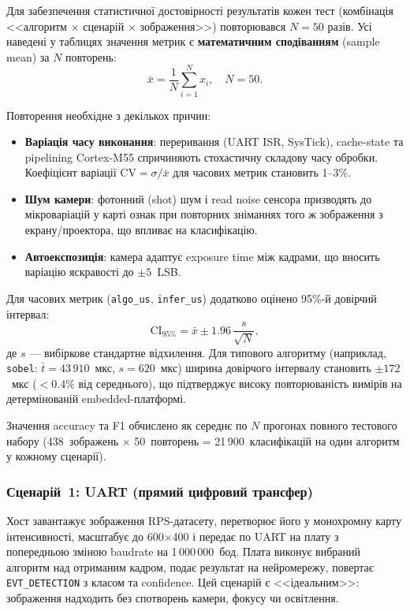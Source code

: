 \documentclass[a4paper,12pt]{article}
\begin{document}
Для забезпечення статистичної достовірності результатів кожен тест (комбінація <<алгоритм $\times$ сценарій $\times$ зображення>>) повторювався $N=50$ разів. Усі наведені у таблицях значення метрик є \textbf{математичним сподіванням} (sample mean) за $N$ повторень:
\[
\bar{x} = \frac{1}{N}\sum_{i=1}^{N} x_i, \quad N=50.
\]

Повторення необхідне з декількох причин:
\begin{itemize}
	\item \textbf{Варіація часу виконання}: переривання (UART ISR, SysTick), cache-state та pipelining Cortex-M55 спричиняють стохастичну складову часу обробки. Коефіцієнт варіації $\mathrm{CV}=\sigma/\bar{x}$ для часових метрик становить 1--3\%.
	\item \textbf{Шум камери}: фотонний (shot) шум і read noise сенсора призводять до мікроваріацій у карті ознак при повторних зніманнях того ж зображення з екрану/проектора, що впливає на класифікацію.
	\item \textbf{Автоекспозиція}: камера адаптує exposure time між кадрами, що вносить варіацію яскравості до $\pm5$~LSB.
\end{itemize}

Для часових метрик (\texttt{algo\_us}, \texttt{infer\_us}) додатково оцінено 95\%-й довірчий інтервал:
\[
\mathrm{CI}_{95\%} = \bar{x} \pm 1.96\,\frac{s}{\sqrt{N}},
\]
де $s$ --- вибіркове стандартне відхилення. Для типового алгоритму (наприклад, \texttt{sobel}: $\bar{t}=43\,910$~мкс, $s=620$~мкс) ширина довірчого інтервалу становить $\pm172$~мкс ($<$0.4\% від середнього), що підтверджує високу повторюваність вимірів на детермінованій embedded-платформі.

Значення accuracy та F1 обчислено як середнє по $N$ прогонах повного тестового набору (438~зображень $\times$ 50~повторень = 21\,900~класифікацій на один алгоритм у кожному сценарії).

\subsubsection{Сценарій~1: UART (прямий цифровий трансфер)}
Хост завантажує зображення RPS-датасету, перетворює його у монохромну карту інтенсивності, масштабує до 600$\times$400 і передає по UART на плату з попередньою зміною baudrate на 1\,000\,000~бод. Плата виконує вибраний алгоритм над отриманим кадром, подає результат на нейромережу, повертає \texttt{EVT\_DETECTION} з класом та confidence. Цей сценарій є <<ідеальним>>: зображення надходить без спотворень камери, фокусу чи освітлення.
\end{document}
